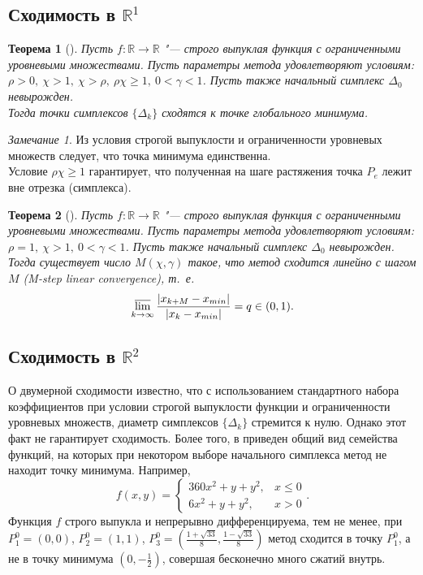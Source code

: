 \documentclass[12pt]{article}
\theoremstyle{plain}
\newtheorem{theorem}{Теорема}
\theoremstyle{remark}
\newtheorem*{remark}{Замечание}
\theoremstyle{definition}
\begin{document}
\subsection{Сходимость в $\mathbb{R}^1$}

\begin{theorem}[\cite{convergence}]
Пусть $f :  \mathbb{R} \to \mathbb{R}$ "--- строго выпуклая функция с ограниченными уровневыми множествами. Пусть параметры метода удовлетворяют условиям: $\rho > 0,\ \chi > 1,\ \chi > \rho,\ \rho\chi \ge 1, \ 0 < \gamma < 1$. Пусть также начальный симплекс $\Delta_0$ невырожден. \\
Тогда точки симплексов $\{\Delta_k\}$ сходятся к точке глобального минимума.
\end{theorem}

\begin{remark}
Из условия строгой выпуклости и ограниченности уровневых множеств следует, что точка минимума единственна.\\
Условие $\rho\chi \ge 1$ гарантирует, что полученная на шаге растяжения точка $P_e$ лежит вне отрезка (симплекса).
\end{remark}

\begin{theorem}[\cite{convergence}]
Пусть $f :  \mathbb{R} \to \mathbb{R}$ "--- строго выпуклая функция с ограниченными уровневыми множествами. Пусть параметры метода удовлетворяют условиям: $\rho =1 ,\ \chi > 1,\ 0 < \gamma < 1$. Пусть также начальный симплекс $\Delta_0$ невырожден. \\
Тогда существует число $M(\chi, \gamma)$ такое, что метод сходится линейно с шагом $M$ \emph{(M-step linear convergence)}, т.~е.
\[ 
\varlimsup_{k \to \infty} \frac{\left| x_{k + M} - x_{min} \right|}{\left| x_k - x_{min} \right|} = q \in (0, 1).
\]
\end{theorem}

\subsection{Сходимость в $\mathbb{R}^2$}

О двумерной сходимости известно, что с использованием стандартного набора коэффициентов при условии строгой выпуклости функции и ограниченности уровневых множеств,  диаметр симплексов $\{\Delta_k\}$ стремится к нулю. Однако этот факт не гарантирует сходимость. Более того, в \cite{counterexample} приведен общий вид семейства функций, на которых при некотором выборе начального симплекса метод не находит точку минимума. Например,
\[
f(x, y) = \begin{cases} 360  x ^2 + y + y^2, & x \le 0 \\
			     6  x  ^2 + y + y^2, & x > 0 \end{cases}.
\]
Функция $f$ строго выпукла и непрерывно дифференцируема, тем не менее, при $P_1^0 = (0, 0)$, $P_2^0 = (1, 1)$, $P_3^0 = (\frac{1 + \sqrt{33}}{8}, \frac{1 - \sqrt{33}}{8})$ метод сходится в точку $P_1^0$, а не в точку минимума $(0, -\frac12)$, совершая бесконечно много сжатий внутрь.
\end{document}
